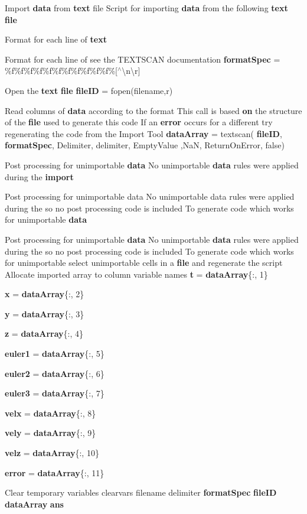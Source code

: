 \begin{DoxyCompactItemize}
\item 
Import \textbf{ data} from \textbf{ text} file Script for importing \textbf{ data} from the following \textbf{ text} \textbf{ file}
\item 
Format for each line of \textbf{ text}
\item 
Format for each line of see the T\+E\+X\+T\+S\+C\+AN documentation \textbf{ format\+Spec} = \textquotesingle{}\%f\%f\%f\%f\%f\%f\%f\%f\%f\%f\%f\%[$^\wedge$\textbackslash{}n\textbackslash{}r]\textquotesingle{}
\item 
Open the \textbf{ text} \textbf{ file} \textbf{ file\+ID} = fopen(filename,\textquotesingle{}r\textquotesingle{})
\item 
Read columns of \textbf{ data} according to the format This call is based \textbf{ on} the structure of the \textbf{ file} used to generate this code If an \textbf{ error} occurs for a different try regenerating the code from the Import Tool \textbf{ data\+Array} = textscan(\textbf{ file\+ID}, \textbf{ format\+Spec}, \textquotesingle{}Delimiter\textquotesingle{}, delimiter, \textquotesingle{}Empty\+Value\textquotesingle{} ,NaN, \textquotesingle{}Return\+On\+Error\textquotesingle{}, false)
\item 
Post processing for unimportable \textbf{ data} No unimportable \textbf{ data} rules were applied during the \textbf{ import}
\item 
Post processing for unimportable data No unimportable data rules were applied during the so no post processing code is included To generate code which works for unimportable \textbf{ data}
\item 
Post processing for unimportable \textbf{ data} No unimportable \textbf{ data} rules were applied during the so no post processing code is included To generate code which works for unimportable select unimportable cells in a \textbf{ file} and regenerate the script Allocate imported array to column variable names \textbf{ t} = \textbf{ data\+Array}\{\+:, 1\}
\item 
\textbf{ x} = \textbf{ data\+Array}\{\+:, 2\}
\item 
\textbf{ y} = \textbf{ data\+Array}\{\+:, 3\}
\item 
\textbf{ z} = \textbf{ data\+Array}\{\+:, 4\}
\item 
\textbf{ euler1} = \textbf{ data\+Array}\{\+:, 5\}
\item 
\textbf{ euler2} = \textbf{ data\+Array}\{\+:, 6\}
\item 
\textbf{ euler3} = \textbf{ data\+Array}\{\+:, 7\}
\item 
\textbf{ velx} = \textbf{ data\+Array}\{\+:, 8\}
\item 
\textbf{ vely} = \textbf{ data\+Array}\{\+:, 9\}
\item 
\textbf{ velz} = \textbf{ data\+Array}\{\+:, 10\}
\item 
\textbf{ error} = \textbf{ data\+Array}\{\+:, 11\}
\item 
Clear temporary variables clearvars filename delimiter \textbf{ format\+Spec} \textbf{ file\+ID} \textbf{ data\+Array} \textbf{ ans}
\end{DoxyCompactItemize}


